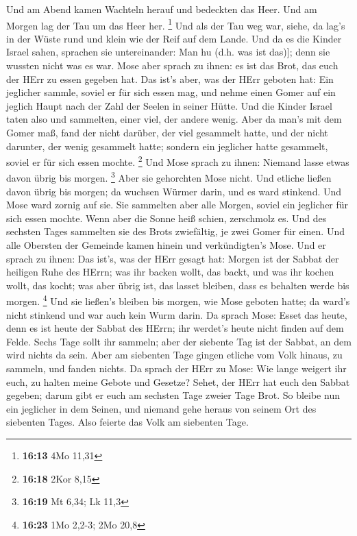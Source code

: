  Und am Abend kamen Wachteln herauf und bedeckten das Heer.
Und am Morgen lag der Tau um das Heer her. \footnote{\textbf{16:13} 4Mo
  11,31}  Und als der Tau weg war, siehe, da lag's in der
Wüste rund und klein wie der Reif auf dem Lande.  Und da es
die Kinder Israel sahen, sprachen sie untereinander: Man hu (d.h. was
ist das){]}; denn sie wussten nicht was es war. Mose aber sprach zu
ihnen: es ist das Brot, das euch der HErr zu essen gegeben hat.
 Das ist's aber, was der HErr geboten hat: Ein jeglicher
sammle, soviel er für sich essen mag, und nehme einen Gomer auf ein
jeglich Haupt nach der Zahl der Seelen in seiner Hütte. 
Und die Kinder Israel taten also und sammelten, einer viel, der andere
wenig.  Aber da man's mit dem Gomer maß, fand der nicht
darüber, der viel gesammelt hatte, und der nicht darunter, der wenig
gesammelt hatte; sondern ein jeglicher hatte gesammelt, soviel er für
sich essen mochte. \footnote{\textbf{16:18} 2Kor 8,15}  Und
Mose sprach zu ihnen: Niemand lasse etwas davon übrig bis morgen.
\footnote{\textbf{16:19} Mt 6,34; Lk 11,3}  Aber sie
gehorchten Mose nicht. Und etliche ließen davon übrig bis morgen; da
wuchsen Würmer darin, und es ward stinkend. Und Mose ward zornig auf
sie.  Sie sammelten aber alle Morgen, soviel ein jeglicher
für sich essen mochte. Wenn aber die Sonne heiß schien, zerschmolz es.
 Und des sechsten Tages sammelten sie des Brots zwiefältig,
je zwei Gomer für einen. Und alle Obersten der Gemeinde kamen hinein und
verkündigten's Mose.  Und er sprach zu ihnen: Das ist's,
was der HErr gesagt hat: Morgen ist der Sabbat der heiligen Ruhe des
HErrn; was ihr backen wollt, das backt, und was ihr kochen wollt, das
kocht; was aber übrig ist, das lasset bleiben, dass es behalten werde
bis morgen. \footnote{\textbf{16:23} 1Mo 2,2-3; 2Mo 20,8} 
Und sie ließen's bleiben bis morgen, wie Mose geboten hatte; da ward's
nicht stinkend und war auch kein Wurm darin.  Da sprach
Mose: Esset das heute, denn es ist heute der Sabbat des HErrn; ihr
werdet's heute nicht finden auf dem Felde.  Sechs Tage
sollt ihr sammeln; aber der siebente Tag ist der Sabbat, an dem wird
nichts da sein.  Aber am siebenten Tage gingen etliche vom
Volk hinaus, zu sammeln, und fanden nichts.  Da sprach der
HErr zu Mose: Wie lange weigert ihr euch, zu halten meine Gebote und
Gesetze?  Sehet, der HErr hat euch den Sabbat gegeben;
darum gibt er euch am sechsten Tage zweier Tage Brot. So bleibe nun ein
jeglicher in dem Seinen, und niemand gehe heraus von seinem Ort des
siebenten Tages.  Also feierte das Volk am siebenten Tage.

